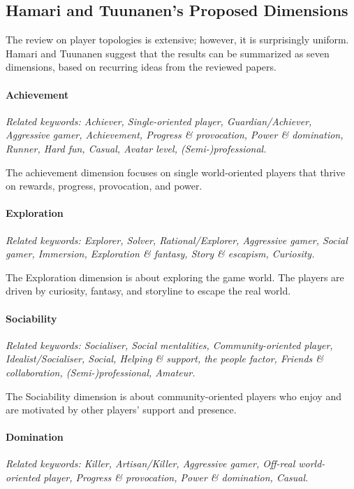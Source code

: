 \subsection{Hamari and Tuunanen’s Proposed Dimensions}
The review on player topologies is extensive; however, it is surprisingly uniform. Hamari and Tuunanen suggest that the results can be summarized as seven dimensions, based on recurring ideas from the reviewed papers.

\paragraph*{Achievement}
\textit{\footnotesize Related keywords: Achiever, Single-oriented player, Guardian/Achiever, Aggressive gamer, Achievement, Progress \& provocation, Power \& domination, Runner, Hard fun, Casual, Avatar level, (Semi-)professional.}

The achievement dimension focuses on single world-oriented players that thrive on rewards, progress, provocation, and power. 
    
\paragraph*{Exploration}
\textit{\footnotesize Related keywords: Explorer, Solver, Rational/Explorer, Aggressive gamer, Social gamer, Immersion, Exploration \& fantasy, Story \& escapism, Curiosity.}

The Exploration dimension is about exploring the game world. The players are driven by curiosity, fantasy, and storyline to escape the real world.
    
\paragraph*{Sociability}
\textit{\footnotesize Related keywords: Socialiser, Social mentalities, Community-oriented player, Idealist/Socialiser, Social, Helping \& support, the people factor, Friends \& collaboration, (Semi-)professional, Amateur.}

The Sociability dimension is about community-oriented players who enjoy and are motivated by other players’ support and presence. 
    
\paragraph*{Domination}
\textit{\footnotesize Related keywords: Killer, Artisan/Killer, Aggressive gamer, Off-real world-oriented player, Progress \& provocation, Power \& domination, Casual.}


